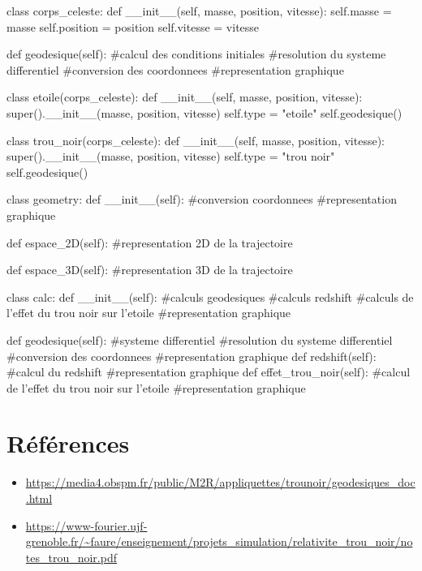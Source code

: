 \documentclass{article}
\begin{document}
\begin{python}
    class corps_celeste:
        def __init__(self, masse, position, vitesse):
            self.masse = masse
            self.position = position
            self.vitesse = vitesse

        def geodesique(self):
            #calcul des conditions initiales
            #resolution du systeme differentiel
            #conversion des coordonnees
            #representation graphique

    class etoile(corps_celeste):
        def __init__(self, masse, position, vitesse):
            super().__init__(masse, position, vitesse)
            self.type = "etoile"
            self.geodesique()
    
    class trou_noir(corps_celeste):
        def __init__(self, masse, position, vitesse):
            super().__init__(masse, position, vitesse)
            self.type = "trou noir"
            self.geodesique()
    
    class geometry:
        def __init__(self):
            #conversion coordonnees
            #representation graphique

        def espace_2D(self):
            #representation 2D de la trajectoire
        
        def espace_3D(self):
            #representation 3D de la trajectoire

    class calc:
        def __init__(self):
            #calculs geodesiques
            #calculs redshift
            #calculs de l'effet du trou noir sur l'etoile
            #representation graphique
        
        def geodesique(self):
            #systeme differentiel
            #resolution du systeme differentiel
            #conversion des coordonnees
            #representation graphique
        def redshift(self):
            #calcul du redshift
            #representation graphique
        def effet_trou_noir(self):
            #calcul de l'effet du trou noir sur l'etoile
            #representation graphique

\end{python}
\newpage
\section{Références}

\begin{itemize}
    \item \url{https://media4.obspm.fr/public/M2R/appliquettes/trounoir/geodesiques_doc.html}
    \item \url{https://www-fourier.ujf-grenoble.fr/~faure/enseignement/projets_simulation/relativite_trou_noir/notes_trou_noir.pdf}
\end{itemize}
\end{document}
